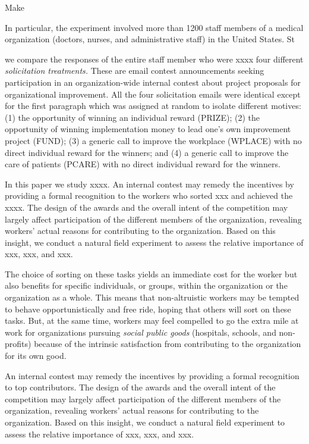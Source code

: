 \documentclass[12pt, titlepage]{article}
\begin{document}
Make

In particular, the experiment involved more than 1200 staff members of a
medical organization (doctors, nurses, and administrative staff) in the
United States. St

we compare the responses of the entire staff member who were xxxx four
different \emph{solicitation treatments.} These are email contest
announcements seeking participation in an organization-wide internal
contest about project proposals for organizational improvement. All the
four solicitation emails were identical except for the first paragraph
which was assigned at random to isolate different motives: (1) the
opportunity of winning an individual reward (PRIZE); (2) the opportunity
of winning implementation money to lead one's own improvement project
(FUND); (3) a generic call to improve the workplace (WPLACE) with no
direct individual reward for the winners; and (4) a generic call to
improve the care of patients (PCARE) with no direct individual reward
for the winners.

In this paper we study xxxx. An internal contest may remedy the
incentives by providing a formal recognition to the workers who sorted
xxx and achieved the xxxx. The design of the awards and the overall
intent of the competition may largely affect participation of the
different members of the organization, revealing workers' actual reasons
for contributing to the organization. Based on this insight, we conduct
a natural field experiment to assess the relative importance of xxx,
xxx, and xxx.

The choice of sorting on these tasks yields an immediate cost for the
worker but also benefits for specific individuals, or groups, within the
organization or the organization as a whole. This means that
non-altruistic workers may be tempted to behave opportunistically and
free ride, hoping that others will sort on these tasks. But, at the same
time, workers may feel compelled to go the extra mile at work for
organizations pursuing \emph{social public goods} (hospitals, schools,
and non-profits) because of the intrinsic satisfaction from contributing
to the organization for its own good.

An internal contest may remedy the incentives by providing a formal
recognition to top contributors. The design of the awards and the
overall intent of the competition may largely affect participation of
the different members of the organization, revealing workers' actual
reasons for contributing to the organization. Based on this insight, we
conduct a natural field experiment to assess the relative importance of
xxx, xxx, and xxx.
\end{document}
